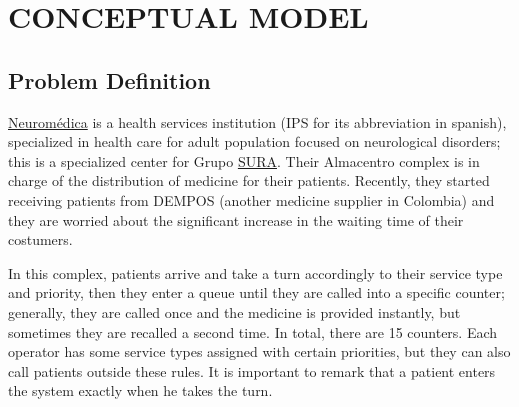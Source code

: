 \section{CONCEPTUAL MODEL}

\subsection{Problem Definition}
\href{http://www.neuromedica.com.co/}{Neurom\'edica} is a health services institution (IPS for its abbreviation in spanish), specialized in health care for adult population focused on neurological disorders; this is a specialized center for Grupo \href{https://www.epssura.com/}{SURA}. Their Almacentro complex is in charge of the distribution of medicine for their patients. Recently, they started receiving patients from DEMPOS (another medicine supplier in Colombia) and they are worried about the significant increase in the waiting time of their costumers.

In this complex, patients arrive and take a turn accordingly to their service type and priority, then they enter a queue until they are called into a specific counter; generally, they are called once and the medicine is provided instantly, but sometimes they are recalled a second time. In total, there are 15 counters. Each operator has some service types assigned with certain priorities, but they can also call patients outside these rules. It is important to remark that a patient enters the system exactly when he takes the turn.

